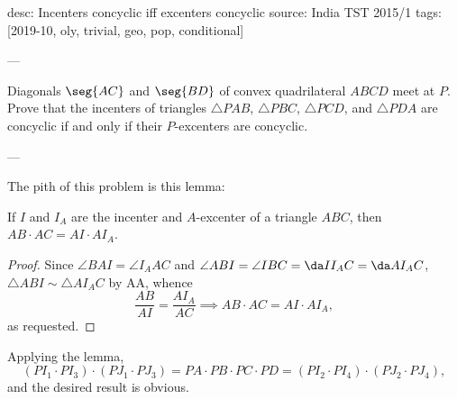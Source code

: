 desc: Incenters concyclic iff excenters concyclic
source: India TST 2015/1
tags: [2019-10, oly, trivial, geo, pop, conditional]

---

Diagonals $\seg{AC}$ and $\seg{BD}$ of convex quadrilateral $ABCD$ meet at $P$. Prove that the incenters of triangles $\triangle PAB$, $\triangle PBC$, $\triangle PCD$, and $\triangle PDA$ are concyclic if and only if their $P$-excenters are concyclic.

---

The pith of this problem is this lemma:
\begin{lemma*}
    If $I$ and $I_A$ are the incenter and $A$-excenter of a triangle $ABC$, then $AB\cdot AC=AI\cdot AI_A$.
\end{lemma*}
\begin{proof}
    Since $\angle BAI=\angle I_AAC$ and $\angle ABI=\angle IBC=\da II_AC=\da AI_AC$, $\triangle ABI\sim\triangle AI_AC$ by AA, whence \[\frac{AB}{AI}=\frac{AI_A}{AC}\implies AB\cdot AC=AI\cdot AI_A,\]
    as requested.
\end{proof}

Applying the lemma, \[(PI_1\cdot PI_3)\cdot(PJ_1\cdot PJ_3)=PA\cdot PB\cdot PC\cdot PD=(PI_2\cdot PI_4)\cdot(PJ_2\cdot PJ_4),\]
and the desired result is obvious.

